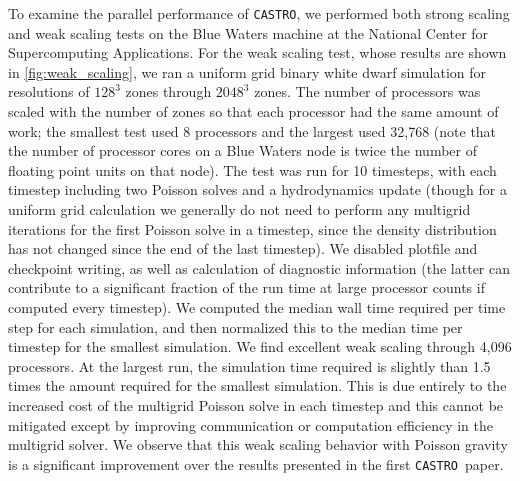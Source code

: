 \documentclass[iop,numberedappendix]{../emulateapj}
\newcommand{\castro}{\texttt{CASTRO}}
\begin{document}
To examine the parallel performance of \castro, we performed both
strong scaling and weak scaling tests on the Blue Waters machine at
the National Center for Supercomputing Applications. For the weak
scaling test, whose results are shown in \autoref{fig:weak_scaling},
we ran a uniform grid binary white dwarf simulation for resolutions of
$128^3$ zones through $2048^3$ zones. The number of processors was
scaled with the number of zones so that each processor had the same
amount of work; the smallest test used 8 processors and the largest
used 32,768 (note that the number of processor cores on a Blue Waters
node is twice the number of floating point units on that node). The
test was run for 10 timesteps, with each timestep including two
Poisson solves and a hydrodynamics update (though for a uniform grid
calculation we generally do not need to perform any multigrid
iterations for the first Poisson solve in a timestep, since the
density distribution has not changed since the end of the last
timestep). We disabled plotfile and checkpoint writing, as well as
calculation of diagnostic information (the latter can contribute to a
significant fraction of the run time at large processor counts if
computed every timestep). We computed the median wall time required
per time step for each simulation, and then normalized this to the
median time per timestep for the smallest simulation. We find
excellent weak scaling through 4,096 processors. At the largest run,
the simulation time required is slightly than 1.5 times the amount
required for the smallest simulation.  This is due entirely to the
increased cost of the multigrid Poisson solve in each timestep and
this cannot be mitigated except by improving communication or
computation efficiency in the multigrid solver. We observe that this
weak scaling behavior with Poisson gravity is a significant
improvement over the results presented in the first \castro\ paper.
\end{document}
